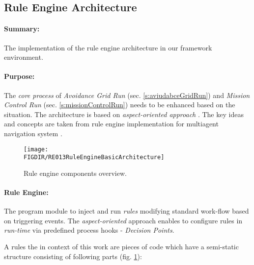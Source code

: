 \subsection{Rule Engine Architecture}\label{s:RuleEngineArchitecture}

\paragraph{Summary:} The implementation of the rule engine architecture in our framework environment. 

\paragraph{Purpose:} The \emph{core process} of \emph{Avoidance Grid Run} (sec. \ref{s:aviudabceGridRun}) and \emph{Mission Control Run} (sec. \ref{s:missionControlRun}) needs to be enhanced based on  the situation. The architecture is based on \emph{aspect-oriented approach} \cite{hill2003jess}. The key ideas and concepts are taken from rule engine implementation for multiagent  navigation system \cite{seyboth2013event}.

\begin{figure}[H]
    \centering
    \texttt{[image: \\FIGDIR/RE013RuleEngineBasicArchitecture]}
    \caption{Rule engine components overview.}
    \label{fig:RuleEngineBasicArchitecture}
\end{figure}

\paragraph{Rule Engine:} The program module to inject and run \emph{rules} modifying standard work-flow based on  triggering events. The \emph{aspect-oriented} approach enables to configure rules in \emph{run-time} via predefined process hooks - \emph{Decision Points}. 

\noindent A rules the in context of this work are pieces of code which have a semi-static structure consisting of following parts (fig. \ref{fig:RuleEngineBasicArchitecture}):


